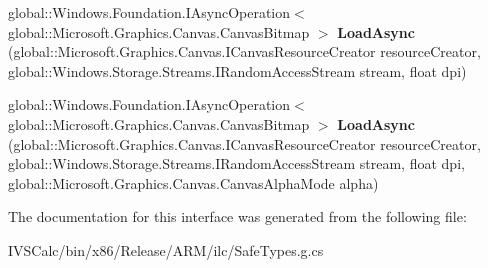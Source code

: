 \begin{DoxyCompactItemize}
global\+::\+Windows.\+Foundation.\+I\+Async\+Operation$<$ global\+::\+Microsoft.\+Graphics.\+Canvas.\+Canvas\+Bitmap $>$ {\bfseries Load\+Async} (global\+::\+Microsoft.\+Graphics.\+Canvas.\+I\+Canvas\+Resource\+Creator resource\+Creator, global\+::\+Windows.\+Storage.\+Streams.\+I\+Random\+Access\+Stream stream, float dpi)
\item 
\mbox{\label{interface_microsoft_1_1_graphics_1_1_canvas_1_1_i_canvas_bitmap_statics_afd0875cf4cff3bb91591f059f391dbbf}} 
global\+::\+Windows.\+Foundation.\+I\+Async\+Operation$<$ global\+::\+Microsoft.\+Graphics.\+Canvas.\+Canvas\+Bitmap $>$ {\bfseries Load\+Async} (global\+::\+Microsoft.\+Graphics.\+Canvas.\+I\+Canvas\+Resource\+Creator resource\+Creator, global\+::\+Windows.\+Storage.\+Streams.\+I\+Random\+Access\+Stream stream, float dpi, global\+::\+Microsoft.\+Graphics.\+Canvas.\+Canvas\+Alpha\+Mode alpha)
\end{DoxyCompactItemize}


The documentation for this interface was generated from the following file\+:\begin{DoxyCompactItemize}
\item 
I\+V\+S\+Calc/bin/x86/\+Release/\+A\+R\+M/ilc/Safe\+Types.\+g.\+cs\end{DoxyCompactItemize}

